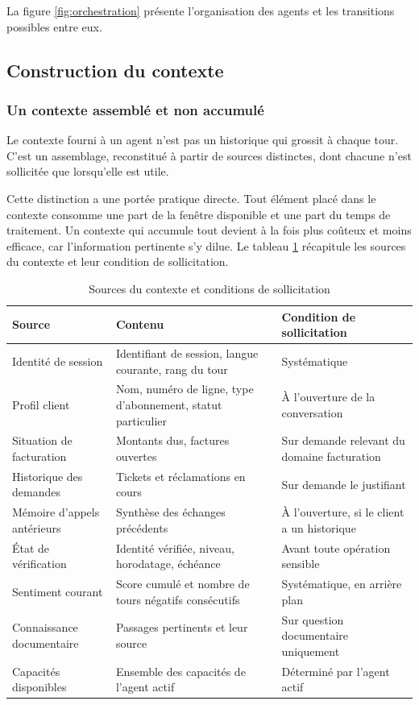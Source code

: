 La figure \ref{fig:orchestration} présente l'organisation des agents et les transitions possibles entre eux.


\subsection{Construction du contexte}

\subsubsection{Un contexte assemblé et non accumulé}

Le contexte fourni à un agent n'est pas un historique qui grossit à chaque tour. C'est un assemblage, reconstitué à partir de sources distinctes, dont chacune n'est sollicitée que lorsqu'elle est utile.

Cette distinction a une portée pratique directe. Tout élément placé dans le contexte consomme une part de la fenêtre disponible et une part du temps de traitement. Un contexte qui accumule tout devient à la fois plus coûteux et moins efficace, car l'information pertinente s'y dilue. Le tableau \ref{tab:contexte} récapitule les sources du contexte et leur condition de sollicitation.

\begin{table}[H]
\centering
\renewcommand{\arraystretch}{1.2}
\begin{tabular}{|p{4.0cm}|p{5.0cm}|p{5.5cm}|}
\hline
\textbf{Source} & \textbf{Contenu} & \textbf{Condition de sollicitation} \\
\hline
Identité de session & Identifiant de session, langue courante, rang du tour & Systématique \\
\hline
Profil client & Nom, numéro de ligne, type d'abonnement, statut particulier & À l'ouverture de la conversation \\
\hline
Situation de facturation & Montants dus, factures ouvertes & Sur demande relevant du domaine facturation \\
\hline
Historique des demandes & Tickets et réclamations en cours & Sur demande le justifiant \\
\hline
Mémoire d'appels antérieurs & Synthèse des échanges précédents & À l'ouverture, si le client a un historique \\
\hline
État de vérification & Identité vérifiée, niveau, horodatage, échéance & Avant toute opération sensible \\
\hline
Sentiment courant & Score cumulé et nombre de tours négatifs consécutifs & Systématique, en arrière plan \\
\hline
Connaissance documentaire & Passages pertinents et leur source & Sur question documentaire uniquement \\
\hline
Capacités disponibles & Ensemble des capacités de l'agent actif & Déterminé par l'agent actif \\
\hline
\end{tabular}
\caption{Sources du contexte et conditions de sollicitation}
\label{tab:contexte}
\end{table}

